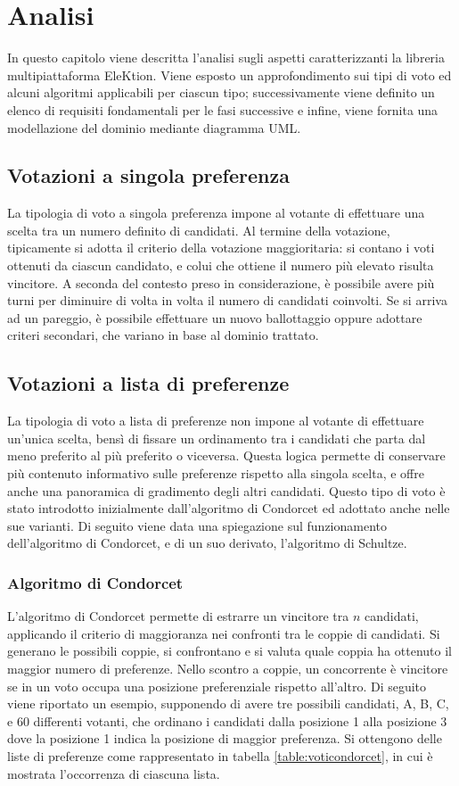 \documentclass[12pt,a4paper,openright,twoside]{book}
\begin{document}
\chapter{Analisi}
In questo capitolo viene descritta l'analisi sugli aspetti caratterizzanti la libreria multipiattaforma EleKtion.
Viene esposto un approfondimento sui tipi di voto
ed alcuni algoritmi applicabili per ciascun tipo; successivamente viene definito un 
elenco di requisiti fondamentali per le fasi successive e infine,
viene fornita una modellazione del dominio mediante diagramma UML.
\section{Votazioni a singola preferenza}
La tipologia di voto a singola preferenza impone al votante di effettuare una scelta tra un
numero definito di candidati. Al termine della votazione, tipicamente si adotta il criterio
della votazione maggioritaria: si contano i voti ottenuti da ciascun candidato, e colui che ottiene il
numero più elevato risulta vincitore. A seconda del contesto preso in considerazione,
è possibile avere più turni per diminuire di volta in volta il numero di candidati coinvolti.
Se si arriva ad un pareggio, è possibile effettuare un nuovo ballottaggio oppure adottare
criteri secondari, che variano in base al dominio trattato.
\section{Votazioni a lista di preferenze}
\label{chapter:votazionilistapreferenze}
La tipologia di voto a lista di preferenze non impone al votante di effettuare un'unica scelta,
bensì di fissare un ordinamento tra i candidati che parta dal meno preferito al più preferito
o viceversa. Questa logica permette di conservare più contenuto informativo sulle preferenze
rispetto alla singola scelta, e offre anche una panoramica di gradimento degli altri candidati.
Questo tipo di voto è stato introdotto inizialmente dall'algoritmo di Condorcet ed adottato
anche nelle sue varianti. Di seguito viene data una spiegazione sul funzionamento dell'algoritmo
di Condorcet, e di un suo derivato, l'algoritmo di Schultze.
\subsection{Algoritmo di Condorcet}
L'algoritmo di Condorcet permette di estrarre un vincitore tra ${n}$ candidati,
applicando il criterio di maggioranza nei confronti tra le coppie di candidati.
Si generano le possibili coppie, si confrontano e si valuta quale coppia ha ottenuto il
maggior numero di preferenze. Nello scontro a coppie, un concorrente è vincitore se in un
voto occupa una posizione preferenziale rispetto all'altro.
Di seguito viene riportato un esempio, supponendo di avere tre possibili candidati, A, B, C,
e 60 differenti votanti, che ordinano i candidati dalla posizione 1 alla posizione 3 dove la posizione 1 
indica la posizione di maggior preferenza.
Si ottengono delle liste di preferenze come rappresentato in tabella \ref{table:voticondorcet}, in cui
è mostrata l'occorrenza di ciascuna lista.
\end{document}
